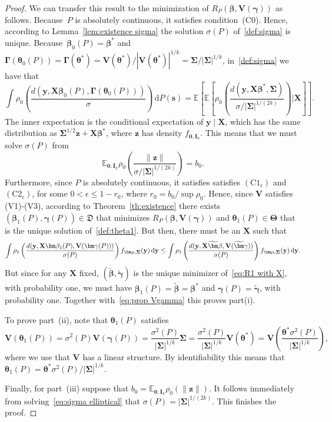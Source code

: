 \documentclass{article}
\numberwithin{equation}{section}
\theoremstyle{plain}
\newcommand{\dd}{\mathrm{d}}
\newcommand{\bbeta}{\bm\beta}
\newcommand{\btheta}{\bm\theta}
\newcommand{\bgamma}{\bm\gamma}
\newcommand{\bmu}{\bm\mu}
\newcommand{\bSigma}{\mathbf{\Sigma}}
\newcommand{\bGamma}{\bm\Gamma}
\newcommand{\bTheta}{\bm\Theta}
\newcommand{\by}{\mathbf{y}}
\newcommand{\bs}{\mathbf{s}}
\newcommand{\bz}{\mathbf{z}}
\newcommand{\bX}{\mathbf{X}}
\newcommand{\bV}{\mathbf{V}}
\newcommand{\bI}{\mathbf{I}}
\newcommand{\E}{\mathbb{E}}
\begin{document}
\begin{proof}
We can transfer this result to the minimization of $R_P(\bbeta,\bV(\bgamma))$ as follows.
Because~$P$ is absolutely continuous, it satisfies condition~(C0).
Hence, according to Lemma~\ref{lem:existence sigma} the solution $\sigma(P)$ of~\eqref{def:sigma} is unique.
Because~$\bbeta_0(P)=\bbeta^*$ and $\bGamma(\btheta_0(P))=\bGamma(\btheta^*)=\bV(\btheta^*)/|\bV(\btheta^*)|^{1/k}=\bSigma/|\bSigma|^{1/k}$,
in~\eqref{def:sigma} we have that
\[
\int
\rho_0
\left(
\frac{d(\by,\bX\bbeta_0(P),\bGamma(\btheta_0(P)))}{\sigma}
\right)
\,
\text{d}P(\bs)
=
\E
\left[
\E
\left[
\rho_0
\left(
\frac{d(\by,\bX\bbeta^*,\bSigma)}{\sigma/|\bSigma|^{1/(2k)}}
\right)
\bigg|
\bX
\right]
\right].
\]
The inner expectation is the conditional expectation of $\by\mid\bX$,
which has the same distribution as $\bSigma^{1/2}\bz+\bX\bbeta^*$,
where $\bz$ has density $f_{\textbf{0},\bI_k}$.
This means that we must solve $\sigma(P)$ from
\begin{equation}
\label{eq:sigma elliptical}
\E_{\mathbf{0},\bI_k}
\rho_0
\left(
\frac{\|\bz\|}{\sigma/|\bSigma|^{1/(2k)}}
\right)
=
b_0.
\end{equation}
Furthermore, since $P$ is absolutely continuous, it satisfies 
satisfies $(\text{C1}_\epsilon)$ and $(\text{C2}_\epsilon)$, for some $0<\epsilon\leq 1-r_0$,
where $r_0=b_0/\sup\rho_0$. 
Hence, since $\bV$ satisfies (V1)-(V3), according to Theorem~\ref{th:existence} there exists $(\bbeta_1(P),\bgamma(P))\in \mathfrak{D}$ 
that minimizes $R_P(\bbeta,\bV(\bgamma))$ and $\btheta_1(P)\in\bTheta$ that is the unique solution of~\eqref{def:theta1}.
But then, there must be an $\bX$ such that
\[
\begin{split}
\int \rho_1
\left(
\frac{d(\by,\bX\bbeta_1(P),\bV(\bgamma(P)))}{\sigma(P)}
\right)
f_{\bmu,\bSigma}(\by)
\,\dd \mathbf{y}
\leq
\int \rho_1
\left(
\frac{d(\by,\bX\widetilde\bbeta,\bV(\widetilde\bgamma))}{\sigma(P)}
\right)
f_{\bmu,\bSigma}(\by)
\,\dd \mathbf{y}.
\end{split}
\]
But since for any $\bX$ fixed, $(\widetilde{\bbeta},\widetilde{\bgamma})$ is the unique minimizer of~\eqref{eq:R1 with X},
with probability one, we must have $\bbeta_1(P)=\widetilde{\bbeta}=\bbeta^*$ and $\bgamma(P)=\widetilde{\bgamma}$,
with probability one.
Together with~\eqref{eq:prop Vgamma} this proves part(i).

To prove part~(ii), note that $\btheta_1(P)$ satisfies
\[
\bV(\btheta_1(P))
=
\sigma^2(P)\bV(\bgamma(P))
=
\frac{\sigma^2(P)}{|\bSigma|^{1/k}}\bSigma
=
\frac{\sigma^2(P)}{|\bSigma|^{1/k}}
\bV(\btheta^*)
=
\bV\left(\frac{\btheta^*\sigma^2(P)}{|\bSigma|^{1/k}}\right),
\]
where we use that $\bV$ has a linear structure.
By identifiability
this means that $\btheta_1(P)=\btheta^*\sigma^2(P)/|\bSigma|^{1/k}$.

Finally, for part~(iii) suppose that $b_0=\E_{\mathbf{0},\bI_k}\rho_0(\|\bz\|)$.
It follows immediately from solving~\eqref{eq:sigma elliptical} that $\sigma(P)=|\bSigma|^{1/(2k)}$.
This finishes the proof.
\end{proof}
\end{document}
